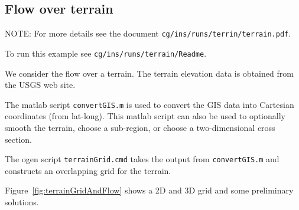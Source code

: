 \newcommand{\Gt}{\Gc_{t}}
\subsection{Flow over terrain}\label{sec:terrain}


NOTE: For more details see the document {\tt cg/ins/runs/terrin/terrain.pdf}.


To run this example see {\tt cg/ins/runs/terrain/Readme}.


We consider the flow over a terrain. The terrain elevation data is 
obtained from the USGS web site.

The matlab script {\tt convertGIS.m} is used to convert the GIS data
into Cartesian coordinates (from lat-long). This matlab script
can also be used to optionally smooth the terrain, choose a sub-region,
or choose a two-dimensional cross section. 

The ogen script {\tt terrainGrid.cmd} takes the output from {\tt convertGIS.m}
and constructs an overlapping grid for the terrain.

Figure~\ref{fig:terrainGridAndFlow} shows a 2D and 3D grid and some preliminary
solutions.




